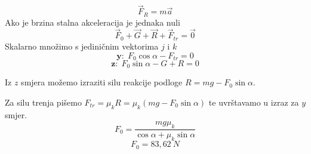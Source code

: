 

$$ \vec{F}_R=m\vec{a}$$
Ako je brzina stalna akceleracija je jednaka nuli
$$\vec{F}_0+\vec{G}+\vec{R}+\vec{F}_{tr}=\vec{0} $$
Skalarno množimo s jediničnim vektorima $j$ i $k$
$$ \textbf{y:}\ \  F_0\cos\alpha -F_{tr}=0 $$
$$  \textbf{z:}\ \ F_0\sin\alpha-G + R =0$$

Iz $z$ smjera možemo izraziti silu reakcije podloge
$R=mg-F_0\sin\alpha$.
 
Za silu trenja pišemo $F_{tr}=\mu_k R=\mu_k (mg-F_0\sin\alpha)$ te uvrštavamo u izraz za $y$ smjer.
$$
F_0=\frac{mg\mu_k}{\cos\alpha+\mu_k\sin\alpha}
$$
$$
F_0=83,62\ N
$$

